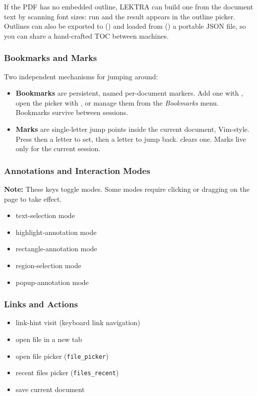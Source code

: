 \documentclass[a4paper,12pt]{article}
\begin{document}
If the PDF has no embedded outline, LEKTRA can build one from the document text by scanning font sizes: run  and the result appears in the outline picker. Outlines can also be exported to () and loaded from () a portable JSON file, so you can share a hand-crafted TOC between machines.

\subsubsection{Bookmarks and Marks}

Two independent mechanisms for jumping around:
\begin{itemize}[leftmargin=*]
    \item \textbf{Bookmarks} are persistent, named per-document markers. Add one with , open the picker with , or manage them from the \textit{Bookmarks} menu. Bookmarks survive between sessions.
    \item \textbf{Marks} are single-letter jump points inside the current document, Vim-style. Press  then a letter to set,  then a letter to jump back.  clears one. Marks live only for the current session.
\end{itemize}

\subsubsection{Annotations and Interaction Modes}
\begin{ghnote}
    \textbf{Note:} These keys toggle modes. Some modes require clicking or dragging on the page to take effect.
\end{ghnote}

\begin{itemize}[leftmargin=*]
    \item {} text-selection mode
    \item {} highlight-annotation mode
    \item {} rectangle-annotation mode
    \item {} region-selection mode
    \item {} popup-annotation mode
\end{itemize}

\subsubsection{Links and Actions}
\begin{itemize}[leftmargin=*]
    \item {} link-hint visit (keyboard link navigation)
    \item {} open file in a new tab
    \item {} open file picker (\texttt{file\_\allowbreak{}picker})
    \item {} recent files picker (\texttt{files\_\allowbreak{}recent})
    \item {} save current document
\end{itemize}
\end{document}
